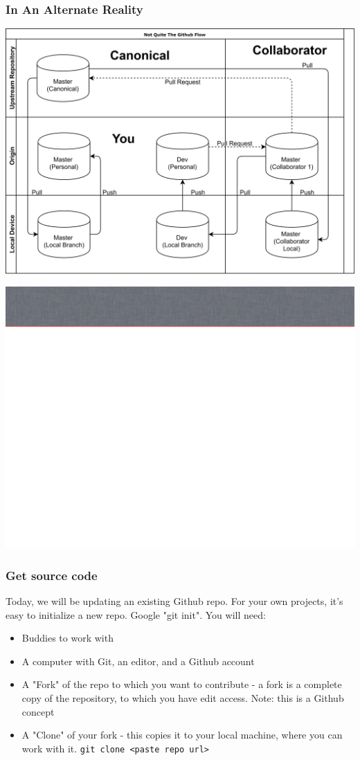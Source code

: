 \documentclass[unknownkeysallowed]{beamer}
\begin{document}
\begin{frame}
    \vspace{.25cm}
    \frametitle{In An Alternate Reality}
	\begin{center}
	\includegraphics[width = .8\linewidth]{assets/thenextlevel}
	\end{center}
    \vspace{.25cm}
\end{frame}

{\includegraphics[width=\paperwidth,height=\paperheight]{assets/slide_bg}}

\begin{frame}[fragile]
    \frametitle{Get source code}
Today, we will be updating an existing Github repo. For your own projects, it's easy to initialize a new repo. Google "git init".
You will need:
    \begin{itemize}
        \item{Buddies to work with}
        \item{A computer with Git, an editor, and a Github account}
        \item{A "Fork" of the repo to which you want to contribute - a fork is a complete copy of the repository, to which you have edit access. Note: this is a Github concept}
        \item{A "Clone" of your fork - this copies it to your local machine, where you can work with it.  \verb/git clone <paste repo url>/}
    \end{itemize}
\end{frame}
\end{document}
